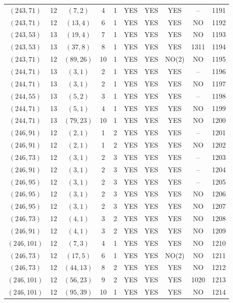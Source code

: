 \begin{longtable}{|c|c|c|c|c|c|c|c|c|c|}
$(243, 71)$ & 12 & $(7, 2)$ & 4 & 1 & YES & YES & YES & -- & 1191\\
$(243, 71)$ & 12 & $(13, 4)$ & 6 & 1 & YES & YES & YES & NO & 1192\\
$(243, 53)$ & 13 & $(19, 4)$ & 7 & 1 & YES & YES & YES & NO & 1193\\
$(243, 53)$ & 13 & $(37, 8)$ & 8 & 1 & YES & YES & YES & 1311 & 1194\\
$(243, 71)$ & 12 & $(89, 26)$ & 10 & 1 & YES & YES & NO(2) & NO & 1195\\
$(244, 71)$ & 13 & $(3, 1)$ & 2 & 1 & YES & YES & YES & -- & 1196\\
$(244, 71)$ & 13 & $(3, 1)$ & 2 & 1 & YES & YES & YES & NO & 1197\\
$(244, 55)$ & 13 & $(5, 2)$ & 3 & 1 & YES & YES & YES & -- & 1198\\
$(244, 71)$ & 13 & $(5, 1)$ & 4 & 1 & YES & YES & YES & NO & 1199\\
$(244, 71)$ & 13 & $(79, 23)$ & 10 & 1 & YES & YES & YES & NO & 1200\\
$(246, 91)$ & 12 & $(2, 1)$ & 1 & 2 & YES & YES & YES & -- & 1201\\
$(246, 91)$ & 12 & $(2, 1)$ & 1 & 2 & YES & YES & YES & NO & 1202\\
$(246, 73)$ & 12 & $(3, 1)$ & 2 & 3 & YES & YES & YES & -- & 1203\\
$(246, 91)$ & 12 & $(3, 1)$ & 2 & 3 & YES & YES & YES & -- & 1204\\
$(246, 95)$ & 12 & $(3, 1)$ & 2 & 3 & YES & YES & YES & -- & 1205\\
$(246, 95)$ & 12 & $(3, 1)$ & 2 & 3 & YES & YES & YES & NO & 1206\\
$(246, 95)$ & 12 & $(3, 1)$ & 2 & 3 & YES & YES & YES & NO & 1207\\
$(246, 73)$ & 12 & $(4, 1)$ & 3 & 2 & YES & YES & YES & NO & 1208\\
$(246, 91)$ & 12 & $(4, 1)$ & 3 & 2 & YES & YES & YES & NO & 1209\\
$(246, 101)$ & 12 & $(7, 3)$ & 4 & 1 & YES & YES & YES & NO & 1210\\
$(246, 73)$ & 12 & $(17, 5)$ & 6 & 1 & YES & YES & NO(2) & NO & 1211\\
$(246, 73)$ & 12 & $(44, 13)$ & 8 & 2 & YES & YES & YES & NO & 1212\\
$(246, 101)$ & 12 & $(56, 23)$ & 9 & 2 & YES & YES & YES & 1020 & 1213\\
$(246, 101)$ & 12 & $(95, 39)$ & 10 & 1 & YES & YES & YES & NO & 1214\\

\end{longtable}
